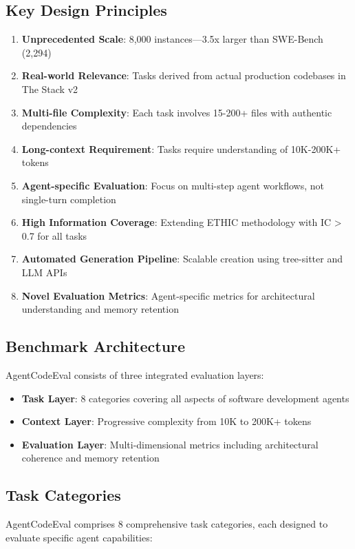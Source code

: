 \documentclass{article}
\begin{document}
\subsection{Key Design Principles}
\begin{enumerate}
    \item \textbf{Unprecedented Scale}: 8,000 instances—3.5x larger than SWE-Bench (2,294)
    \item \textbf{Real-world Relevance}: Tasks derived from actual production codebases in The Stack v2
    \item \textbf{Multi-file Complexity}: Each task involves 15-200+ files with authentic dependencies
    \item \textbf{Long-context Requirement}: Tasks require understanding of 10K-200K+ tokens
    \item \textbf{Agent-specific Evaluation}: Focus on multi-step agent workflows, not single-turn completion
    \item \textbf{High Information Coverage}: Extending ETHIC methodology with IC > 0.7 for all tasks
    \item \textbf{Automated Generation Pipeline}: Scalable creation using tree-sitter and LLM APIs
    \item \textbf{Novel Evaluation Metrics}: Agent-specific metrics for architectural understanding and memory retention
\end{enumerate}

\subsection{Benchmark Architecture}
AgentCodeEval consists of three integrated evaluation layers:
\begin{itemize}
    \item \textbf{Task Layer}: 8 categories covering all aspects of software development agents
    \item \textbf{Context Layer}: Progressive complexity from 10K to 200K+ tokens
    \item \textbf{Evaluation Layer}: Multi-dimensional metrics including architectural coherence and memory retention
\end{itemize}

\subsection{Task Categories}

AgentCodeEval comprises 8 comprehensive task categories, each designed to evaluate specific agent capabilities:
\end{document}
